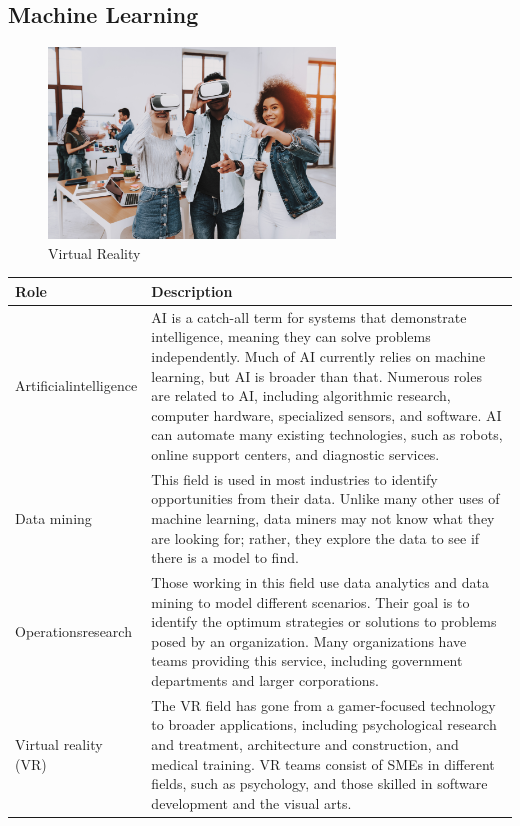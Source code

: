 \subsection{Machine Learning}

\begin{figure}[H]
	\begin{center}
		\caption{Virtual Reality}
		\vskip 4pt
		\includegraphics[height=2in]{images/careers/iStock-1051052494.small.jpg}
	\end{center}
\end{figure}

\begin{table}[H]
	\begin{center}
		\begin{tabular}{p{1in}|p{3.4in}} 
			\textbf{Role} & \textbf{Description}\\
			\hline
			Artificial\linebreak intelligence & AI is a catch-all term for systems that demonstrate intelligence, meaning they can solve problems independently. Much of AI currently relies on machine learning, but AI is broader than that. Numerous roles are related to AI, including algorithmic research, computer hardware, specialized sensors, and software. AI can automate many existing technologies, such as robots, online support centers, and diagnostic services.\\
			\hline
			Data mining & This field is used in most industries to identify opportunities from their data. Unlike many other uses of machine learning, data miners may not know what they are looking for; rather, they explore the data to see if there is a model to find.\\
			\hline
			Operations\linebreak research & Those working in this field use data analytics and data mining to model different scenarios. Their goal is to identify the optimum strategies or solutions to problems posed by an organization. Many organizations have teams providing this service, including government departments and larger corporations.\\
			\hline
			Virtual reality (VR) & The VR field has gone from a gamer-focused technology to broader applications, including psychological research and treatment, architecture and construction, and medical training. VR teams consist of SMEs in different fields, such as psychology, and those skilled in software development and the visual arts.\\
			\hline
		\end{tabular}
	\end{center}
\end{table}

